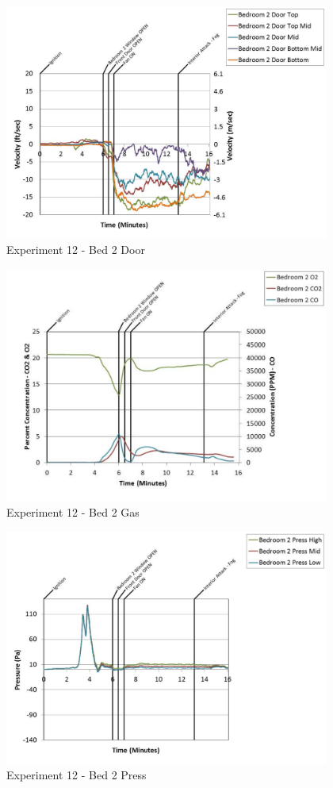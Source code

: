 \documentclass{article}
\begin{document}
\begin{appendices}
	\begin{figure}[h!]
		\centering
		\includegraphics[height=3.05in]{0_Images/Results_Charts/Exp_12_Charts/Bed2Door.pdf}
		\caption{Experiment 12 - Bed 2 Door}
	\end{figure}
 
	\clearpage

	\begin{figure}[h!]
		\centering
		\includegraphics[height=3.05in]{0_Images/Results_Charts/Exp_12_Charts/Bed2Gas.pdf}
		\caption{Experiment 12 - Bed 2 Gas}
	\end{figure}
 

	\begin{figure}[h!]
		\centering
		\includegraphics[height=3.05in]{0_Images/Results_Charts/Exp_12_Charts/Bed2Press.pdf}
		\caption{Experiment 12 - Bed 2 Press}
	\end{figure}
 

\end{appendices}
\end{document}
